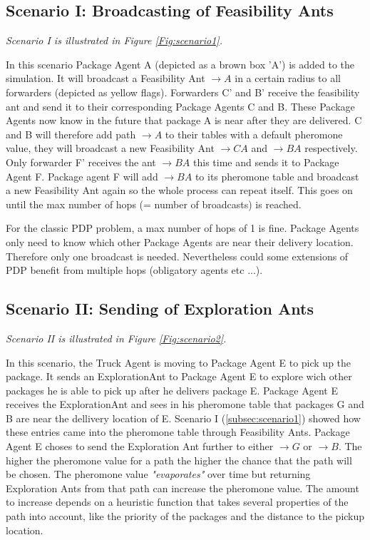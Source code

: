 \subsection*{Scenario I: Broadcasting of Feasibility Ants}
\label{subsec:scenario1}
\npar \textit{Scenario I is illustrated in Figure \ref{Fig:scenario1}.}

\npar In this scenario Package Agent A (depicted as a brown box 'A') is added to the simulation. It will broadcast a Feasibility Ant \textit{$\rightarrow A$} in a certain radius to all forwarders (depicted as yellow flags). Forwarders C' and B' receive the feasibility ant and send it to their corresponding Package Agents C and B. These Package Agents now know in the future that package A is near after they are delivered. C and B will therefore add path \textit{$\rightarrow A$} to their tables with a default pheromone value, they will broadcast a new Feasibility Ant \textit{$\rightarrow CA$} and \textit{$\rightarrow BA$} respectively. Only forwarder F' receives the ant \textit{$\rightarrow BA$} this time and sends it to Package Agent F. Package agent F will add \textit{$\rightarrow BA$} to its pheromone table and broadcast a new Feasibility Ant again so the whole process can repeat itself. This goes on until the max number of hops (= number of broadcasts) is reached.

\npar For the classic PDP problem, a max number of hops of 1 is fine. Package Agents only need to know which other Package Agents are near their delivery location. Therefore only one broadcast is needed. Nevertheless could some extensions of PDP benefit from multiple hops (obligatory agents etc ...).

\subsection*{Scenario II: Sending of Exploration Ants}
\label{subsec:scenario2}
\npar \textit{Scenario II is illustrated in Figure \ref{Fig:scenario2}.}


\npar In this scenario, the Truck Agent is moving to Package Agent E to pick up the package. It sends an ExplorationAnt to Package Agent E to explore wich other packages he is able to pick up after he delivers package E. Package Agent E receives the ExplorationAnt and sees in his pheromone table that packages G and B are near the dellivery location of E. Scenario I (\ref{subsec:scenario1}) showed how these entries came into the pheromone table through Feasibility Ants. Package Agent E choses to send the Exploration Ant further to either \textit{$\rightarrow G$} or \textit{$\rightarrow B$}. The higher the pheromone value for a path the higher the chance that the path will be chosen. The pheromone value \textit{"evaporates"}  over time but returning Exploration Ants from that path can increase the pheromone value. The amount to increase depends on a heuristic function that takes several properties of the path into account, like the priority of the packages and the distance to the pickup location.

